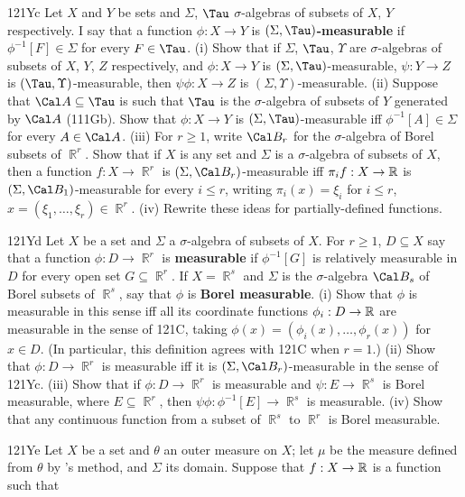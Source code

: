 {\spheader 121Yc Let $X$ and $Y$ be sets and $\Sigma$, $\Tau$
$\sigma$-algebras of subsets of $X$, $Y$ respectively.   I say that a
function $\phi:X\to Y$ is $(\Sigma,\Tau)${\bf-measurable} if
$\phi^{-1}[F]\in\Sigma$ for every $F\in\Tau$.   (i) Show that if
$\Sigma$, $\Tau$, $\Upsilon$ are $\sigma$-algebras of subsets of $X$,
$Y$, $Z$ respectively, and $\phi:X\to Y$ is $(\Sigma,\Tau)$-measurable,
$\psi:Y\to Z$ is $(\Tau,\Upsilon)$-measurable, then $\psi\phi:X\to Z$ is
$(\Sigma,\Upsilon)$-measurable.   
(ii) Suppose that $\Cal A\subseteq\Tau$ is such that $\Tau$ is the
$\sigma$-algebra of subsets of $Y$ generated by $\Cal A$ (111Gb).   Show
that $\phi:X\to Y$ is $(\Sigma,\Tau)$-measurable iff
$\phi^{-1}[A]\in\Sigma$ for every $A\in\Cal A$.
(iii) For $r\ge 1$, write
$\Cal B_r$ for the
$\sigma$-algebra of Borel subsets of $\BbbR^r$.   Show that if $X$ is
any set and $\Sigma$ is a $\sigma$-algebra of subsets of $X$, then a
function $f:X\to\BbbR^r$ is $(\Sigma,\Cal B_r)$-measurable iff
$\pi_if:X\to\Bbb R$ is $(\Sigma,\Cal B_1)$-measurable for every
$i\le r$, writing $\pi_i(x)=\xi_i$ for $i\le r$,
$x=(\xi_1,\ldots,\xi_r)\in\BbbR^r$.    (iv) Rewrite these ideas
for partially-defined functions.
     
\spheader 121Yd Let $X$ be a set and $\Sigma$ a $\sigma$-algebra
of subsets of $X$.   For $r\ge 1$, $D\subseteq X$ say that a function
$\phi:D\to\BbbR^r$ is {\bf measurable} if $\phi^{-1}[G]$ is relatively
measurable in $D$ for every open set $G\subseteq\BbbR^r$.   If
$X=\BbbR^s$ and $\Sigma$ is the 
$\sigma$-algebra $\Cal B_s$ of Borel subsets of $\BbbR^s$, 
say that $\phi$ is {\bf Borel measurable}.
(i) Show that $\phi$ is measurable in this sense iff all its
coordinate functions $\phi_i:D\to\Bbb R$ are measurable in the sense of
121C, taking $\phi(x)=(\phi_i(x),\ldots,\phi_r(x))$ for $x\in D$.   (In
particular, this definition agrees with 121C when $r=1$.)
(ii) Show that $\phi:D\to\BbbR^r$ is measurable iff it is
$(\Sigma,\Cal B_r)$-measurable in the sense of 121Yc.
(iii) Show that if $\phi:D\to\BbbR^r$ is measurable and
$\psi:E\to\BbbR^s$ is Borel measurable, where $E\subseteq\BbbR^r$,
then $\psi\phi:\phi^{-1}[E]\to\BbbR^s$ is measurable.
(iv) Show that any continuous function from a subset of
$\BbbR^s$ to $\BbbR^r$ is Borel measurable.
     
\spheader 121Ye Let $X$ be a set and $\theta$ an outer measure
on $X$;  let $\mu$ be the measure defined from $\theta$ by
\Caratheodory's method, and $\Sigma$ its domain.   Suppose that
$f:X\to\Bbb R$ is a function such that
     
}
